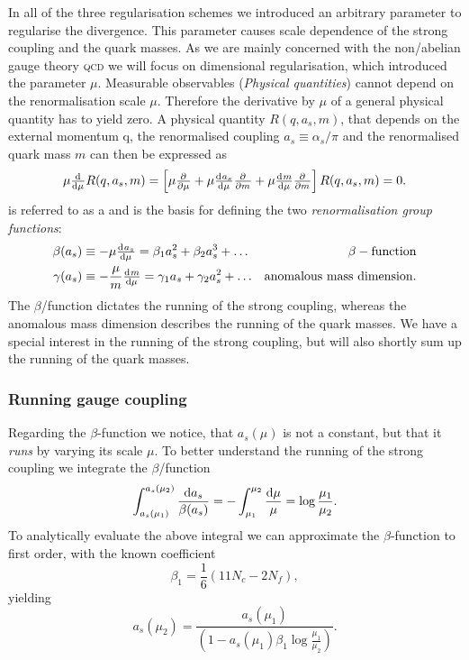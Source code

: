 \documentclass[../../index.tex]{subfiles}
\begin{document}
In all of the three regularisation schemes we introduced an arbitrary parameter
to regularise the divergence. This parameter causes scale dependence of the
strong coupling and the quark masses. As we are mainly concerned with the
non\-/abelian gauge theory \textsc{qcd} we will focus on dimensional
regularisation, which introduced the parameter $\mu$. Measurable observables
(\textit{Physical quantities}) cannot depend on the renormalisation scale $\mu$.
Therefore the derivative by $\mu$ of a general physical quantity has to yield
zero. A physical quantity $R(q, a_s, m)$, that depends on the external momentum
q, the renormalised coupling $a_s\equiv\alpha_s/\pi$ and the renormalised quark
mass $m$ can then be expressed as
\begin{equation}
  \label{eq:RGE}
  \mu \od{}{\mu}R(q, a_s, m) = \left[ \mu \pd{}{\mu} + \mu \od{a_s}{\mu} \pd{}{m} + \mu \od{m}{\mu} \pd{}{m} \right] R(q, a_s, m) = 0.
\end{equation}
 is referred to as a  and
is the basis for defining the two \textit{renormalisation group functions}:
\begin{align}
  \beta(a_s) &\equiv -\mu \od{a_s}{\mu} = \beta_1 a_s^2 + \beta_2 a_s^3 + \dots & \beta-\text{function}
                                                                                  \label{eq:betaFunction} \\
  \gamma(a_s) &\equiv - \frac{\mu}{m} \od{m}{\mu} = \gamma_1 a_s + \gamma_2 a_s^2 + \dots & \text{anomalous mass dimension}.
                                                                                            \label{eq:anomalousMassDimension}
\end{align}
The \(\beta\)\-/function dictates the running of the strong coupling, whereas
the anomalous mass dimension describes the running of the quark masses.
We have a special interest in the running of the strong coupling, but will also
shortly sum up the running of the quark masses.

\subsubsection{Running gauge coupling}
Regarding the $\beta$-function we notice, that $a_s(\mu)$ is not a constant, but
that it \textit{runs} by varying its scale $\mu$. To better understand the
running of the strong coupling we integrate the \(\beta\)\-/function
\begin{equation}
  \int_{a_s(\mu_1)}^{a_s(\mu_2)}\frac{\dif a_s}{\beta(a_s)} = - \int_{\mu_1}^{\mu_2} \frac{\dif \mu}{\mu} = \log \frac{\mu_1}{\mu_2}.
\end{equation}
To analytically evaluate the above integral we can approximate the
$\beta$-function to first order, with the known coefficient
\begin{equation}
  \label{eq:firstBetaCoefficient}
  \beta_1 = \frac{1}{6}(11 N_c - 2 N_f),
\end{equation}
yielding
\begin{equation}
  \label{eq:strongCouplingFirstOrder}
  a_s(\mu_2) = \frac{a_s(\mu_1)}{\left( 1 - a_s(\mu_1) \beta_1 \log\frac{\mu_1}{\mu_2} \right)}.
\end{equation}
\end{document}
